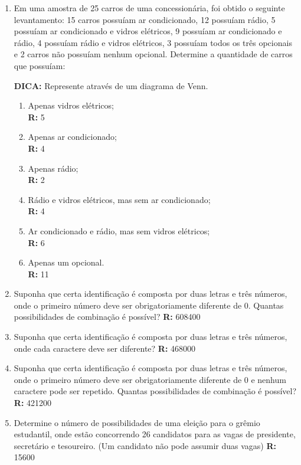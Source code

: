 \documentclass[oneside,a4paper,12pt]{article}
\begin{document}
\begin{enumerate}
	\item Em uma amostra de 25 carros de uma concessionária, foi obtido o seguinte levantamento: 15 carros possuíam ar condicionado, 12 possuíam rádio, 5 possuíam ar condicionado e vidros elétricos, 9 possuíam ar condicionado e rádio, 4 possuíam rádio e vidros elétricos, 3 possuíam todos os três opcionais e 2 carros não possuíam nenhum opcional. Determine a quantidade de carros que possuíam:
	
	{\bf DICA:} Represente através de um diagrama de Venn.
	
	\begin{enumerate}
		\item Apenas vidros elétricos; \\ {\bf R:}  5
		\item Apenas ar condicionado; \\ {\bf R:}  4
		\item Apenas rádio; \\ {\bf R:}  2
		\item Rádio e vidros elétricos, mas sem ar condicionado; \\ {\bf R:}  4
		\item Ar condicionado e rádio, mas sem vidros elétricos; \\ {\bf R:}  6
		\item Apenas um opcional. \\ {\bf R:}  11
	\end{enumerate}
	
	
	\item Suponha que certa identificação é composta por duas letras e três números, onde o primeiro número deve ser obrigatoriamente diferente de 0. Quantas possibilidades de combinação é possível? {\bf R:}  608400

	\item Suponha que certa identificação é composta por duas letras e três números, onde cada caractere deve ser diferente? {\bf R:}  468000
	
	\item Suponha que certa identificação é composta por duas letras e três números, onde o primeiro número deve ser obrigatoriamente diferente de 0 e nenhum caractere pode ser repetido. Quantas possibilidades de combinação é possível? {\bf R:}  421200
	
	\item Determine o número de possibilidades de uma eleição para o grêmio estudantil, onde estão concorrendo 26 candidatos para as vagas de presidente, secretário e tesoureiro. (Um candidato não pode assumir duas vagas) {\bf R:}  15600
	

\end{enumerate}
\end{document}
